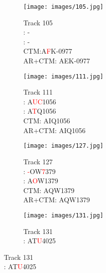 \documentclass[conference]{IEEEtran}
\begin{document}
\begin{figure}[ht] 
  \begin{subfigure}[b]{0.33\linewidth}
    \centering
    \captionsetup{justification=centering}
    \texttt{[image: images/105.jpg]} 
    \caption{Track 105\\
    \cite{ufpr}: -\\
    \cite{layout}: -\\
    {\fontsize{8}{8}\selectfont CTM:A\textcolor{red}{F}K-0977}\\
    {\fontsize{8}{8}\selectfont AR+CTM: AEK-0977}}
    \label{compare:a} 
    \vspace{2ex}
  \end{subfigure}\begin{subfigure}[b]{0.33\linewidth}
    \centering
    \captionsetup{justification=centering}
    \texttt{[image: images/111.jpg]} 
    \caption{Track 111\\
    \cite{ufpr}: A\textcolor{red}{UC}1056\\
    \cite{layout}: A\textcolor{red}{T}Q1056\\
    {\fontsize{8}{8}\selectfont CTM: AIQ1056}\\
    {\fontsize{8}{8}\selectfont AR+CTM: AIQ1056}}
    \label{compare:b} 
    \vspace{2ex}
  \end{subfigure} 
  \begin{subfigure}[b]{0.33\linewidth}
    \centering
    \captionsetup{justification=centering}
    \texttt{[image: images/127.jpg]} 
    \caption{Track 127\\
    \cite{ufpr}: {\fontsize{8}{8}\selectfont \textcolor{red}{-}OW\textcolor{red}{7}379}\\
    \cite{layout}: {\fontsize{8}{8}\selectfont A\textcolor{red}{O}W1379}\\
    {\fontsize{8}{8}\selectfont CTM: AQW1379}\\
    {\fontsize{8}{8}\selectfont AR+CTM: AQW1379}}
    \label{compare:b} 
    \vspace{2ex}
  \end{subfigure} 
  \begin{subfigure}[b]{0.33\linewidth}
    \centering
    \captionsetup{justification=centering}
    \texttt{[image: images/131.jpg]} 
    \caption{Track 131 \\
    \cite{ufpr}: {\fontsize{8}{8}\selectfont AT\textcolor{red}{U}4025}\\
}
\end{subfigure}
\end{figure}
\end{document}
